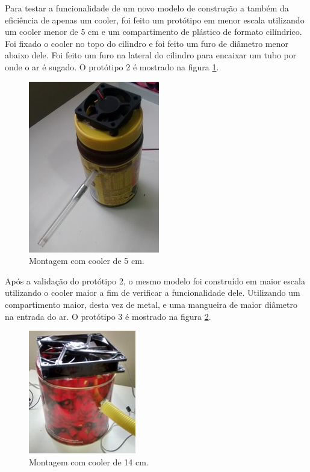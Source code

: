 		Para testar a funcionalidade de um novo modelo de construção a também da eficiência de apenas um cooler, foi feito um protótipo em menor escala utilizando um cooler menor de 5 cm e um compartimento de plástico de formato cilíndrico. Foi fixado o cooler no topo do cilindro e foi feito um furo de diâmetro menor abaixo dele. Foi feito um furo na lateral do cilindro para encaixar um tubo por onde o ar é sugado. O protótipo 2 é mostrado na figura \ref{img:cooler_5cm}.

		\begin{figure}[H]
			\centering
			\includegraphics[scale=1]{figuras/asppc2_2.jpg}
			\caption{Montagem com cooler de 5 cm.}
			\label{img:cooler_5cm}
		\end{figure}

		Após a validação do protótipo 2, o mesmo modelo foi construído em maior escala utilizando o cooler maior a fim de verificar a funcionalidade dele. Utilizando um compartimento maior, desta vez de metal, e uma mangueira de maior diâmetro na entrada do ar. O protótipo 3 é mostrado na figura \ref{img:cooler_14cm}.

		\begin{figure}[H]
			\centering
			\includegraphics[scale=1]{figuras/asppc2_3.jpg}
			\caption{Montagem com cooler de 14 cm.}
			\label{img:cooler_14cm}
		\end{figure}

